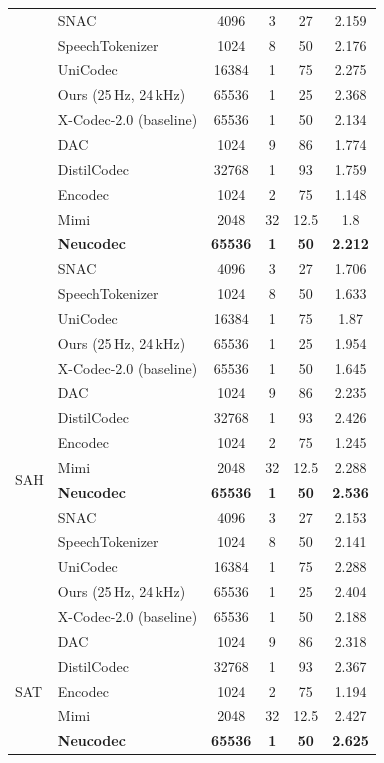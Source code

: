 \documentclass[preprint]{article}
\begin{document}
\begin{longtable}{llcccc}
  & SNAC & 4096 & 3 & 27 & 2.159 \\
  & SpeechTokenizer & 1024 & 8 & 50 & 2.176 \\
  & UniCodec & 16384 & 1 & 75 & 2.275 \\
  & Ours (25\,Hz, 24\,kHz) & 65536 & 1 & 25 & 2.368 \\
  & X-Codec-2.0 (baseline) & 65536 & 1 & 50 & 2.134 \\
\newpage
\multirow{8}{*}{RW}
  & DAC & 1024 & 9 & 86 & 1.774 \\
  & DistilCodec & 32768 & 1 & 93 & 1.759 \\
  & Encodec & 1024 & 2 & 75 & 1.148 \\
  & Mimi & 2048 & 32 & 12.5 & 1.8 \\
  & \textbf{Neucodec} & \textbf{65536} & \textbf{1} & \textbf{50} & \textbf{2.212} \\
  & SNAC & 4096 & 3 & 27 & 1.706 \\
  & SpeechTokenizer & 1024 & 8 & 50 & 1.633 \\
  & UniCodec & 16384 & 1 & 75 & 1.87 \\
  & Ours (25\,Hz, 24\,kHz) & 65536 & 1 & 25 & 1.954 \\
  & X-Codec-2.0 (baseline) & 65536 & 1 & 50 & 1.645 \\
\midrule
\multirow{8}{*}{SAH}
  & DAC & 1024 & 9 & 86 & 2.235 \\
  & DistilCodec & 32768 & 1 & 93 & 2.426 \\
  & Encodec & 1024 & 2 & 75 & 1.245 \\
  & Mimi & 2048 & 32 & 12.5 & 2.288 \\
  & \textbf{Neucodec} & \textbf{65536} & \textbf{1} & \textbf{50} & \textbf{2.536} \\
  & SNAC & 4096 & 3 & 27 & 2.153 \\
  & SpeechTokenizer & 1024 & 8 & 50 & 2.141 \\
  & UniCodec & 16384 & 1 & 75 & 2.288 \\
  & Ours (25\,Hz, 24\,kHz) & 65536 & 1 & 25 & 2.404 \\
  & X-Codec-2.0 (baseline) & 65536 & 1 & 50 & 2.188 \\
\midrule
\multirow{8}{*}{SAT}
  & DAC & 1024 & 9 & 86 & 2.318 \\
  & DistilCodec & 32768 & 1 & 93 & 2.367 \\
  & Encodec & 1024 & 2 & 75 & 1.194 \\
  & Mimi & 2048 & 32 & 12.5 & 2.427 \\
  & \textbf{Neucodec} & \textbf{65536} & \textbf{1} & \textbf{50} & \textbf{2.625} \\

\end{longtable}
\end{document}
